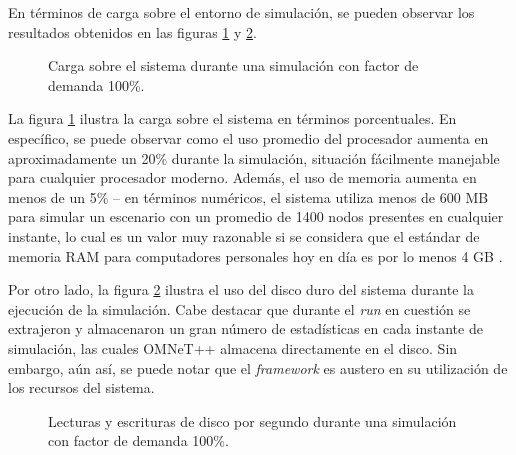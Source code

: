 En términos de carga sobre el entorno de simulación, se pueden observar los resultados obtenidos en las figuras \ref{fig:systemload:cpuram} y \ref{fig:systemload:io}. 

\begin{figure}[htpb]
    \centering
    
    \caption{Carga sobre el sistema durante una simulación con factor de demanda 100\%.}
    \label{fig:systemload:cpuram}
\end{figure}

La figura \ref{fig:systemload:cpuram} ilustra la carga sobre el sistema en términos porcentuales. En específico, se puede observar como el uso promedio del procesador aumenta en aproximadamente un 20\% durante la simulación, situación fácilmente manejable para cualquier procesador moderno. Además, el uso de memoria aumenta en menos de un 5\% -- en términos numéricos, el sistema utiliza menos de 600 MB para simular un escenario con un promedio de 1400 nodos presentes en cualquier instante, lo cual es un valor muy razonable si se considera que el estándar de memoria RAM para computadores personales hoy en día es por lo menos 4 GB \autocite{steamhwsurvey, unityhardwaresurvey}.

Por otro lado, la figura \ref{fig:systemload:io} ilustra el uso del disco duro del sistema durante la ejecución de la simulación. 
Cabe destacar que durante el \emph{run} en cuestión se extrajeron y almacenaron un gran número de estadísticas en cada instante de simulación, las cuales OMNeT++ almacena directamente en el disco. 
Sin embargo, aún así, se puede notar que el \emph{framework} es austero en su utilización de los recursos del sistema.

\begin{figure}[htpb]
    \centering
    
    \caption[I/O en disco durante simulación]{Lecturas y escrituras de disco por segundo durante una simulación con factor de demanda 100\%.}
    \label{fig:systemload:io}
\end{figure} 